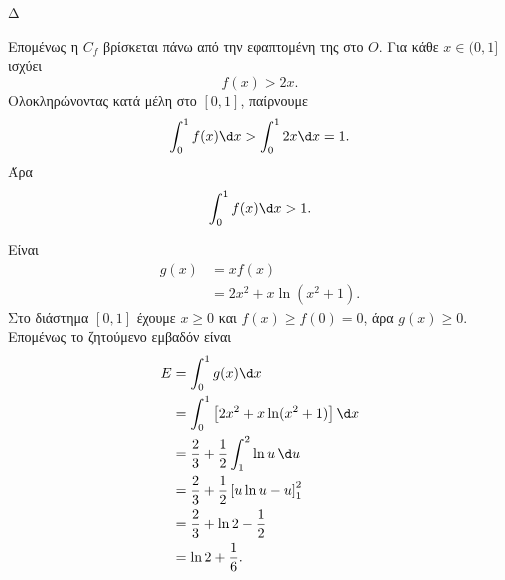 \begin{thema}{Δ}
\begin{erwthma}
Επομένως η $C_f$ βρίσκεται πάνω από την εφαπτομένη της στο $O$. Για κάθε $x\in(0,1]$ ισχύει
\[
f(x)>2x.
\]
Ολοκληρώνοντας κατά μέλη στο $[0,1]$, παίρνουμε
\[
\int_0^1f(x)\d x
>\int_0^1 2x\d x
=1.
\]
Άρα
\[
{\int_0^1f(x)\d x>1}.
\]

\item Είναι
\begin{align*}
g(x)
&=xf(x)\\
&=2x^2+x\ln(x^2+1).
\end{align*}
Στο διάστημα $[0,1]$ έχουμε $x\geq0$ και $f(x)\geq f(0)=0$, άρα $g(x)\geq0$. Επομένως το ζητούμενο εμβαδόν είναι
\begin{align*}
E
&=\int_0^1g(x)\d x\\
&=\int_0^1\left[2x^2+x\ln(x^2+1)\right]\d x\\
&=\frac{2}{3}
+\frac{1}{2}\int_1^2\ln u\,\d u\\
&=\frac{2}{3}
+\frac{1}{2}\left[u\ln u-u\right]_1^2\\
&=\frac{2}{3}+\ln2-\frac{1}{2}\\
&={\ln2+\frac{1}{6}}.
\end{align*}
\end{erwthma}
\end{thema}

